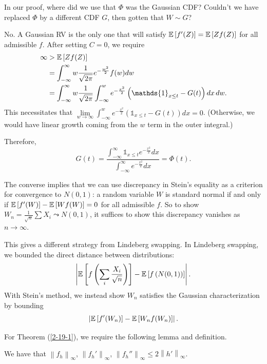\begin{remark}
	In our proof, where did we use that $\Phi$ was the Gaussian CDF? Couldn't we have replaced $\Phi$ by a different CDF $G$, then gotten that $W \sim G$?

	No. A Gaussian RV is the only one that will satisfy $\mathbb{E}\left[f'(Z)\right] = \mathbb{E}\left[Z f(Z)\right]$ for all admissible $f$.
	After setting $C=0$, we require
	\begin{align*}
		\infty 
		&> \E\left[Z f(Z)\right]  \\
		&= \int_{-\infty}^{\infty} w \frac{1}{\sqrt{2\pi} } e^{-\frac{w^2}{2}}f(w)dw \\
		&= \int_{-\infty}^{\infty}  w \frac{1}{\sqrt{2\pi} } \int_{-\infty}^{w} e^{-\frac{x^2}{2}} \left( \mathds{1}_{x \le t} - G(t) \right) dx\, dw
	.\end{align*}
	This necessitates that $\lim\limits_{w \to \infty} \int_{-\infty}^{w} e^{-\frac{x^2}{2}}\left( \mathds{1}_{x \le t}- G(t) \right)dx = 0$. (Otherwise, we would have linear growth coming from the $w$ term in the outer integral.)

	Therefore, \[
		G(t) = \frac{\int_{-\infty}^{\infty} \mathds{1}_{x \le t} e^{-\frac{x^2}{2}}dx }{\int_{-\infty}^{\infty} e^{-\frac{x^2}{2}}dx } = \Phi(t)
	.\] 
\end{remark}

\begin{aside}
	The converse implies that we can use discrepancy in Stein's equality as a criterion for convergence to $N(0,1)$: a random variable $W$ is standard normal if and only if $\mathbb{E}\left[f'(W)\right] - \mathbb{E}\left[Wf(W)\right] = 0$ for all admissible $f$. So to show $W_n = \frac{1}{\sqrt{n}}\sum X_i \leadsto N(0,1)$, it suffices to show this discrepancy vanishes as $n \to \infty$.

	This gives a different strategy from Lindeberg swapping. In Lindeberg swapping, we bounded the direct distance between distributions:
	\[
		\left| \mathbb{E}\left[f\left( \sum\limits_{i}^{} \frac{X_i}{\sqrt{n} } \right)\right] - \mathbb{E}\left[f\left( N(0,1) \right)\right]  \right|
	.\] With Stein's method, we instead show $W_n$ satisfies the Gaussian characterization by bounding \[
		\left|\mathbb{E}\left[f'(W_n)\right] - \mathbb{E}\left[W_n f(W_n)\right]\right|
	.\]

\end{aside}

For Theorem (\ref{2-19-1}), we require the following lemma and definition.

\begin{lemma}
	We have that $\left\|f_h\right\|_{\infty}$, $\left\|f_h'\right\|_{\infty}$, $\left\|f_h''\right\|_{\infty} \le 2 \left\|h'\right\|_{\infty}$.
\end{lemma}

